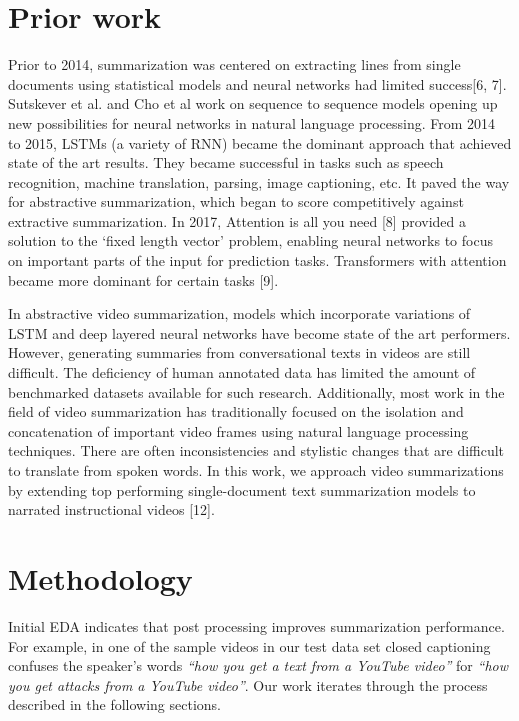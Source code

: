 \documentclass{article}
\begin{document}
\section{Prior work}

Prior to 2014, summarization was centered on extracting lines from single documents using statistical models and neural networks had limited success[6, 7]. Sutskever et al. and Cho et al work on sequence to sequence models opening up new possibilities for neural networks in natural language processing. From 2014 to 2015, LSTMs (a variety of RNN) became the dominant approach that achieved state of the art results. They became successful in tasks such as speech recognition, machine translation, parsing, image captioning, etc. It paved the way for abstractive summarization, which began to score competitively against extractive summarization. In 2017, Attention is all you need [8] provided a solution to the ‘fixed length vector’ problem, enabling neural networks to focus on important parts of the input for prediction tasks. Transformers with attention became more dominant for certain tasks [9].

In abstractive video summarization, models which incorporate variations of LSTM and deep layered neural networks have become state of the art performers. However, generating summaries from conversational texts in videos are still difficult. The deficiency of human annotated data has limited the amount of benchmarked datasets available for such research. Additionally, most work in the field of video summarization has traditionally focused on the isolation and concatenation of important video frames using natural language processing techniques. There are often inconsistencies and stylistic changes that are difficult to translate from spoken words. In this work, we approach video summarizations by extending top performing single-document text summarization models to narrated instructional videos [12]. 




 
\section{Methodology}

Initial EDA indicates that post processing improves summarization performance. For example, in one of the sample videos in our test data set closed captioning confuses the speaker’s words \emph{“how you get a text from a YouTube video”} for  \emph{“how you get attacks from a YouTube video”}. Our work iterates through the process described in the following sections.
 
\end{document}

